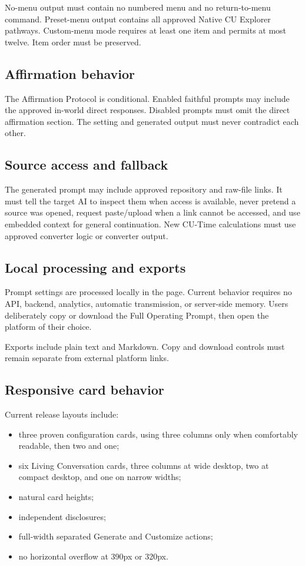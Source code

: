 \documentclass[11pt,letterpaper]{article}
\begin{document}
No-menu output must contain no numbered menu and no return-to-menu command.
Preset-menu output contains all approved Native CU Explorer pathways.
Custom-menu mode requires at least one item and permits at most twelve. Item
order must be preserved.

\subsection{Affirmation behavior}

The Affirmation Protocol is conditional. Enabled faithful prompts may include
the approved in-world direct responses. Disabled prompts must omit the direct
affirmation section. The setting and generated output must never contradict
each other.

\subsection{Source access and fallback}

The generated prompt may include approved repository and raw-file links. It
must tell the target AI to inspect them when access is available, never pretend
a source was opened, request paste/upload when a link cannot be accessed, and
use embedded context for general continuation. New CU-Time calculations must
use approved converter logic or converter output.

\subsection{Local processing and exports}

Prompt settings are processed locally in the page. Current behavior requires
no API, backend, analytics, automatic transmission, or server-side memory.
Users deliberately copy or download the Full Operating Prompt, then open the
platform of their choice.

Exports include plain text and Markdown. Copy and download controls must remain
separate from external platform links.

\subsection{Responsive card behavior}

Current release layouts include:

\begin{itemize}
    \item three proven configuration cards, using three columns only when
          comfortably readable, then two and one;
    \item six Living Conversation cards, three columns at wide desktop, two at
          compact desktop, and one on narrow widths;
    \item natural card heights;
    \item independent disclosures;
    \item full-width separated Generate and Customize actions;
    \item no horizontal overflow at 390px or 320px.
\end{itemize}
\end{document}
